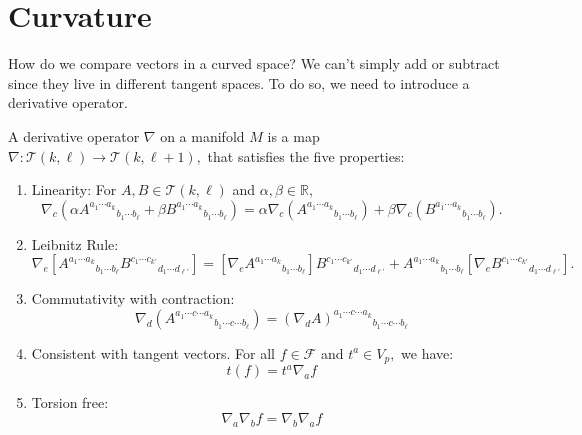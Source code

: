 \documentclass{article}
\numberwithin{equation}{section}
\begin{document}
\section{Curvature}
How do we compare vectors in a curved space? We can't simply add or subtract since they live in different tangent spaces. To do so, we need to introduce a derivative operator.
\begin{definition}
    A derivative operator $\nabla$ on a manifold $M$ is a map $\nabla: \mathcal{T}(k,\ell) \to \mathcal{T}(k,\ell+1),$ that satisfies the five properties:
    \begin{enumerate}
        \item Linearity: For $A,B\in \mathcal{T}(k,\ell)$ and $\alpha,\beta\in \mathbb{R},$
        \begin{equation*}
            \nabla_c(\alpha A^{a_1\cdots a_k}{}_{b_1\cdots b_\ell}+ \beta B^{a_1\cdots a_k}{}_{b_1\cdots b_\ell}) = \alpha \nabla_c(A^{a_1\cdots a_k}{}_{b_1\cdots b_\ell}) + \beta \nabla_c(B^{a_1\cdots a_k}{}_{b_1\cdots b_\ell}). 
        \end{equation*}
        \item Leibnitz Rule:
        \begin{equation*}
            \nabla_e\left[A^{a_1\cdots a_k}{}_{b_1\cdots b_\ell}B^{c_1\cdots c_{k'}}{}_{d_1\cdots d_{\ell'}}\right] = \left[\nabla_e A^{a_1\cdots a_k}{}_{b_1\cdots b_\ell}\right]B^{c_1\cdots c_{k'}}{}_{d_1\cdots d_{\ell'}} + A^{a_1\cdots a_k}{}_{b_1\cdots b_\ell}\left[\nabla_e B^{c_1\cdots c_{k'}}{}_{d_1\cdots d_{\ell'}}\right].
        \end{equation*}
        \item Commutativity with contraction:
        \begin{equation*}
            \nabla_d(A^{a_1\cdots c\cdots a_k}{}_{b_1\cdots c\cdots b_\ell}) = (\nabla_d A)^{a_1\cdots c\cdots a_k}{}_{b_1\cdots c\cdots b_\ell}
        \end{equation*}
        \item Consistent with tangent vectors. For all $f\in \mathcal{F}$ and $t^a\in V_p,$ we have:
        \begin{equation*}
            t(f) = t^a\nabla_a f
        \end{equation*}
        \item Torsion free:
        \begin{equation*}
            \nabla_a\nabla_b f = \nabla_b\nabla_a f
        \end{equation*}
    \end{enumerate}
\end{definition}
\end{document}
